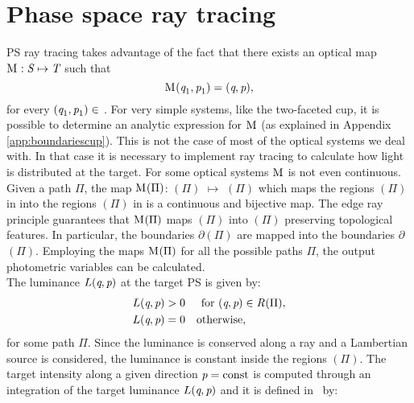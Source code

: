 \section{Phase space ray tracing}
PS ray tracing takes advantage of the fact that there exists an optical map
$
\mathrm{M}_{\textit{}}: \mbox{$\emph{S}_{\textit{}}$} \mapsto \mbox{$\emph{T}_{\textit{}}$}
$
 such that
\begin{equation}
\mathrm{M}_{\textit{}}(\textit{q}_1,\textit{p}_1)=(\textit{q},\textit{p}),
\end{equation} for every $(\textit{q}_1,\textit{p}_1)\in$ .
For very simple systems, like the two-faceted cup, it is possible to determine an analytic expression for $\mathrm{M}_{\textit{}}$ (as explained in Appendix \ref{app:boundariescup}).
This is not the case of most of the optical systems we deal with. In that case it is necessary to implement ray tracing to calculate how light is distributed at the target.
For some optical systems $\mathrm{M}_{\textit{}}$ is not even continuous.
Given a path $\Pi$, the map $\mathrm{M}_{\textit{}}(\Pi)$: $(\Pi)$ $\mapsto$ $(\Pi)$
which maps the regions $(\Pi)$ in  into the regions $(\Pi)$ in  is a continuous and bijective map.
  The edge ray principle guarantees that $\mathrm{M}_{\textit{}}(\Pi)$ maps $(\Pi)$ into $(\Pi)$ preserving topological features. In particular, the boundaries $\partial$$(\Pi)$ are mapped into the boundaries $\partial$$(\Pi)$. %
Employing the maps $\mathrm{M}_{\textit{}}(\Pi)$ for all the possible paths $\Pi$, the output photometric variables can be calculated.
\\ \indent The luminance $L(\textit{q}, \textit{p})$ at the target PS is given by:
\begin{equation}
\begin{aligned}
\label{eq:PSluminance}
L(\variabile{q}, \variabile{p}) &> 0 & \mbox{for } (\variabile{q}, \variabile{p})\in \mbox{\set{R}{}{}}(\Pi),\\ \vspace{0.5 cm}
L(\variabile{q}, \variabile{p}) &= 0 & \mbox{otherwise},\qquad \quad \;\;
\end{aligned}
\end{equation}
for some path $\Pi$. Since the luminance is conserved along a ray and a Lambertian source is considered, the luminance is constant inside the regions $(\Pi)$.
The target intensity along a given direction $\textit{p}=\textrm{const}$ is computed through an integration of the target luminance $L(\textit{q}, \textit{p})$ and it is defined in $\,$ by:
